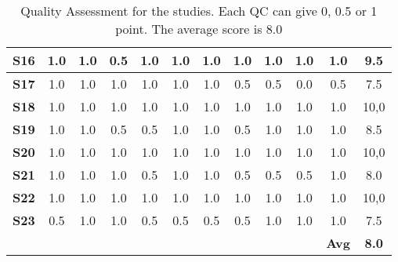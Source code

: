 \begin{table}
\begin{tabular}{|c|c|c|c|c|c|c|c|c|c|c||c|}
    \textbf{S16} & 1.0 & 1.0 & 0.5 & 1.0 & 1.0 & 1.0 & 1.0 & 1.0 & 1.0 & 1.0 & 9.5 \\ \hline
    \textbf{S17} & 1.0 & 1.0 & 1.0 & 1.0 & 1.0 & 1.0 & 0.5 & 0.5 & 0.0 & 0.5 & 7.5 \\ \hline
    \textbf{S18} & 1.0 & 1.0 & 1.0 & 1.0 & 1.0 & 1.0 & 1.0 & 1.0 & 1.0 & 1.0 & 10,0 \\ \hline
    \textbf{S19} & 1.0 & 1.0 & 0.5 & 0.5 & 1.0 & 1.0 & 0.5 & 1.0 & 1.0 & 1.0 & 8.5 \\ \hline
    \textbf{S20} & 1.0 & 1.0 & 1.0 & 1.0 & 1.0 & 1.0 & 1.0 & 1.0 & 1.0 & 1.0 & 10,0 \\ \hline
    \textbf{S21} & 1.0 & 1.0 & 1.0 & 0.5 & 1.0 & 1.0 & 0.5 & 0.5 & 0.5 & 1.0 & 8.0 \\ \hline
    \textbf{S22} & 1.0 & 1.0 & 1.0 & 1.0 & 1.0 & 1.0 & 1.0 & 1.0 & 1.0 & 1.0 & 10,0 \\ \hline
    \textbf{S23} & 0.5 & 1.0 & 1.0 & 0.5 & 0.5 & 0.5 & 0.5 & 1.0 & 1.0 & 1.0 & 7.5 \\ \hline
     &  &  &  &  &  &  &  &  &  & \textbf{Avg} & \textbf{8.0} \\ \hline
    
    \end{tabular}
    
    \caption[Quality Assessment table for studies in the SLR.]{Quality Assessment for the studies. Each QC can give 0, 0.5 or 1 point. The average score is 8.0}
    \label{tab:quality}
\end{table}